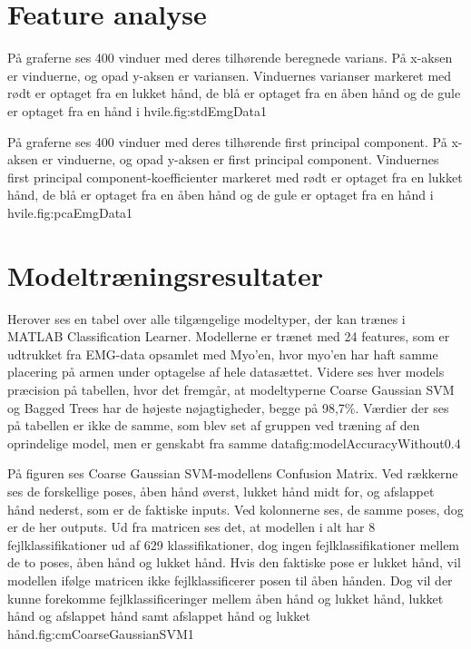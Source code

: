 \thispagestyle{fancy}




\chapter{Feature analyse}
{På graferne ses 400 vinduer med deres tilhørende beregnede varians. På x-aksen er vinduerne, og opad y-aksen er variansen. Vinduernes varianser markeret med rødt er optaget fra en lukket hånd, de blå er optaget fra en åben hånd og de gule er optaget fra en hånd i hvile.}{fig:stdEmgData}{1}
 
{På graferne ses 400 vinduer med deres tilhørende first principal component. På x-aksen er vinduerne, og opad y-aksen er first principal component. Vinduernes first principal component-koefficienter markeret med rødt er optaget fra en lukket hånd, de blå er optaget fra en åben hånd og de gule er optaget fra en hånd i hvile.}{fig:pcaEmgData}{1}

\chapter{Modeltræningsresultater}
{Herover ses en tabel over alle tilgængelige modeltyper, der kan trænes i MATLAB Classification Learner. Modellerne er trænet med 24 features, som er udtrukket fra EMG-data opsamlet med Myo'en, hvor myo'en har haft samme placering på armen under optagelse af hele datasættet. Videre ses hver models præcision på tabellen, hvor det fremgår, at modeltyperne Coarse Gaussian SVM og Bagged Trees har de højeste nøjagtigheder, begge på 98,7\%. Værdier der ses på tabellen er ikke de samme, som blev set af gruppen ved træning af den oprindelige model, men er genskabt fra samme data}{fig:modelAccuracyWithout}{0.4}

{På figuren ses Coarse Gaussian SVM-modellens Confusion Matrix. Ved rækkerne ses de forskellige poses, åben hånd øverst, lukket hånd midt for, og afslappet hånd nederst, som er de faktiske inputs. Ved kolonnerne ses, de samme poses, dog er de her outputs. Ud fra matricen ses det, at modellen i alt har 8 fejlklassifikationer ud af 629 klassifikationer, dog ingen fejlklassifikationer mellem de to poses, åben hånd og lukket hånd. Hvis den faktiske pose er lukket hånd, vil modellen ifølge matricen ikke fejlklassificerer posen til åben hånden. Dog vil der kunne forekomme fejlklassificeringer mellem åben hånd og lukket hånd, lukket hånd og afslappet hånd samt afslappet hånd og lukket hånd.}{fig:cmCoarseGaussianSVM}{1} 

\newpage
\listoftables
\vspace{1cm}
\listoffigures